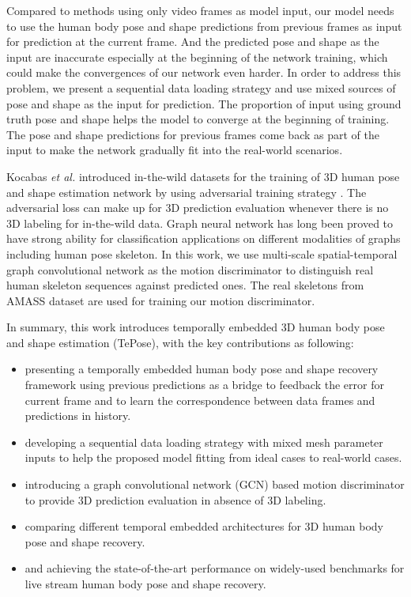 \documentclass[10pt,twocolumn,letterpaper]{article}
\begin{document}
Compared to methods using only video frames as model input, our model needs to use the human body pose and shape predictions from previous frames as input for prediction at the current frame. And the predicted pose and shape as the input are inaccurate especially at the beginning of the network training, which could make the convergences of our network even harder. In order to address this problem, we present a sequential data loading strategy and use mixed sources of pose and shape as the input for prediction. The proportion of input using ground truth pose and shape helps the model to converge at the beginning of training. The pose and shape predictions for previous frames come back as part of the input to make the network gradually fit into the real-world scenarios.


Kocabas \textit{et al.}  introduced in-the-wild datasets for the training of 3D human pose and shape estimation network by using adversarial training strategy \cite{kocabas2020vibe}. The adversarial loss can make up for 3D prediction evaluation whenever there is no 3D labeling for in-the-wild data. Graph neural network has long been proved to have strong ability for classification applications on different modalities of graphs including human pose skeleton. In this work, we use multi-scale spatial-temporal graph convolutional network as the motion discriminator to distinguish real human skeleton sequences against predicted ones. The real skeletons from AMASS dataset \cite{mahmood2019amass} are used for training our motion discriminator.


In summary, this work introduces temporally embedded 3D human body pose and shape estimation (TePose), with the key contributions as following: 

\begin{itemize}
    \item presenting a temporally embedded human body pose and shape recovery framework using previous predictions as a bridge to feedback the error for current frame and to learn the correspondence between data frames and predictions in history. 
    \item developing a sequential data loading strategy with mixed mesh parameter inputs to help the proposed model fitting from ideal cases to real-world cases. 
    \item introducing a graph convolutional network (GCN) based motion discriminator to provide 3D prediction evaluation in absence of 3D labeling.
    \item comparing different temporal embedded architectures for 3D human body pose and shape recovery. 
    \item and achieving the state-of-the-art performance on widely-used benchmarks for live stream human body pose and shape recovery. 
\end{itemize}
\end{document}
